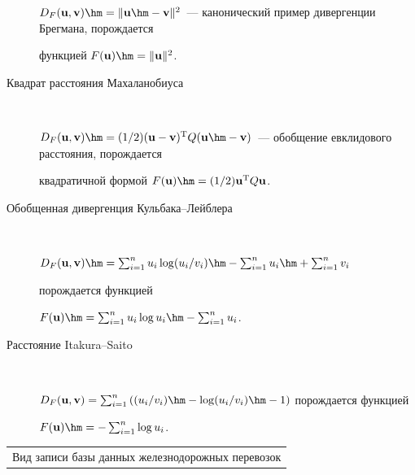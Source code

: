 \begin{multicols}{2}
\begin{description}
    $D_F(\uu, \mathbf{v}) \hm= \| \uu\hm -

    \mathbf{v} \|^2$~--- канонический пример дивергенции Брегмана, порождается

    функцией $F(\uu) \hm= \| \uu \|^2$.

    \item[Квадрат расстояния Махаланобиуса]\



    $D_F(\uu, \mathbf{v})\hm = (1/2)(\uu - \mathbf{v})^{\mathrm{T}} Q (\uu \hm-

    \mathbf{v})$~--- обобщение евклидового расстояния, порождается

    квадратичной формой $F(\uu) \hm= (1/2) \uu^{\mathrm{T}} Q \uu$.

    \item[Обобщенная дивергенция Куль\-ба\-ка--Лейб\-ле\-ра]\



    $D_F(\uu, \mathbf{v}) \hm=

    \sum\nolimits_{i = 1}^n u_i \log ({u_i}/{v_i})

 \hm   - \sum\nolimits_{i = 1}^n u_i\hm + \sum\nolimits_{i = 1}^n v_i$

 по\-рож\-да\-ет\-ся     функцией

 $F(\uu) \hm= \sum\nolimits_{i = 1}^n u_i \log u_i \hm-

    \sum\nolimits_{i = 1}^n

    u_i$.

    \item[Расстояние  Itakura--Saito]\



    $D_F(\uu, \mathbf{v}) = \sum\nolimits_{i = 1}^n \left(

    (u_i/v_i) \hm- \log ({u_i}/{v_i}) \hm- 1    \right)$ порождается функцией

    $F(\uu)\hm = - \sum\nolimits_{i = 1}^n \log

    u_i$.

\end{description}



\begin{table}\small

\begin{center}

   \begin{tabular}{|c|c|c|c|c|c|c|c|}

   \multicolumn{8}{c}{Вид записи базы данных железнодорожных перевозок}\\


\end{tabular}
\end{center}
\end{table}
\end{multicols}
